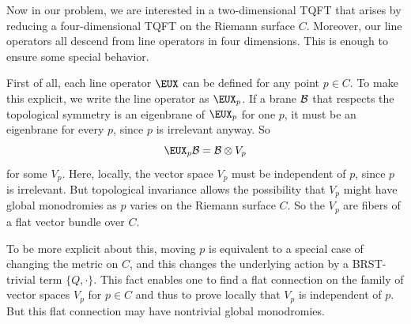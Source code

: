\par{}

Now in our problem, we are interested in a two-dimensional TQFT
that arises by reducing a four-dimensional TQFT on the Riemann
surface $C$. Moreover, our line operators all descend from line
operators in four dimensions.  This is enough to ensure some
special behavior.

First of all, each line operator $\EUX$  can be defined for any
point $p\in C$. To make this explicit, we write the line operator
as $\EUX_p$. If a brane ${\cal B}$ that respects the topological
symmetry is an eigenbrane of $\EUX_p$ for one $p$, it must be an
eigenbrane for every $p$, since $p$ is irrelevant anyway.  So
\setcounter{equation}{24}
\begin{equation}\label{eq:hintico}
\EUX_p{\cal B}={\cal B}\otimes V_p
\end{equation}
 for some $V_p$.
Here, locally, the vector space $V_p$ must be independent of $p$,
since $p$ is irrelevant. But topological invariance allows the
possibility that $V_p$ might have global monodromies as $p$ varies
on the Riemann surface $C$. So the $V_p$ are fibers of a flat
vector bundle over $C$.

To be more explicit about this, moving $p$ is equivalent to a
special case of changing the metric on $C$, and this changes the
underlying action by a BRST-trivial term $\{Q,\cdot\}$.  This fact
enables one to find a flat connection on the family of vector
spaces $V_p$ for $p\in C$ and thus to prove locally that $V_p$ is
independent of $p$. But this flat connection may have nontrivial
global monodromies.

